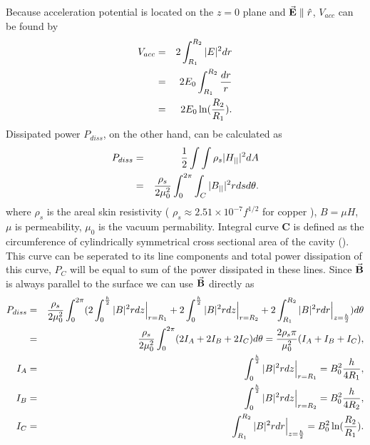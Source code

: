 \documentclass[a4paper,oneside,12pt]{report}
\numberwithin{equation}{chapter}
\begin{document}
Because acceleration potential is located on the $z=0$ plane and $\vec{\textbf{E}} \parallel \hat{r}$, $V_{acc}$ can be found by
\vspace{-10pt}\begin{eqnarray} 
    V_{acc} &=& 2 \int_{R_1}^{R_2} |E|^2 dr \nonumber\\
            &=& 2 E_0 \int_{R_1}^{R_2} \frac{dr}{r} \nonumber\\
            &=& 2 E_0 \ln(\frac{R_2}{R_1}). \label{eq:v_acc}
\vspace{-10pt}\end{eqnarray}
Dissipated power $P_{diss}$, on the other hand, can be calculated as \cite{rf}
\vspace{-10pt}\begin{eqnarray} 
    P_{diss} &=& \frac{1}{2} \int \int \rho_s | H_{||} |^2 dA \nonumber \\
             &=& \frac{\rho_s}{2\mu_0^2} \int_0^{2\pi} \int_C | B_{||} |^2 r ds d\theta . \label{eq:p_diss_C_curve}
\vspace{-10pt}\end{eqnarray}
where $\rho_s$ is the areal skin resistivity ( $\rho_s \approx 2.51 \times 10^{-7} f^{1/2}$ for copper \cite{rhodo_pottier} ), $B=\mu H$, $\mu$ is permeability, $\mu_0$ is the vacuum permability. 
Integral curve \textbf{C} is defined as the circumference of cylindrically symmetrical cross sectional area of the cavity ().
This curve can be seperated to its line components and total power dissipation of this curve, $P_C$ will be equal to sum of the power dissipated in these lines.
Since $\vec{\textbf{B}}$ is always parallel to the surface we can use $\vec{\textbf{B}}$ directly as
\vspace{-10pt}\begin{eqnarray}
    P_{diss} &=& \frac{\rho_s}{2\mu_0^2} \int_0^{2\pi} (
                   2\int_{0}^{\frac{h}{2}} |B|^2 r dz \Big|_{r=R_1}
                 + 2\int_{0}^{\frac{h}{2}} |B|^2 r dz \Big|_{r=R_2} 
                 + 2\int_{R_1}^{R_2} |B|^2 r dr \Big|_{z=\frac{h}{2}})d\theta \nonumber\\
             &=& \frac{\rho_s}{2\mu_0^2} \int_0^{2\pi} (2I_A + 2I_B + 2I_C)d\theta 
                 = \frac{2\rho_s \pi}{\mu_0^2}(I_A + I_B + I_C)   ,\\
    I_A &=& \int_{0}^{\frac{h}{2}} |B|^2 r dz \Big|_{r=R_1} = B_0^2 \frac{h}{4R_1}   ,\\
    I_B &=& \int_{0}^{\frac{h}{2}} |B|^2 r dz \Big|_{r=R_2} = B_0^2 \frac{h}{4R_2}   ,\\
    I_C &=& \int_{R_1}^{R_2} |B|^2 r dr \Big|_{z=\frac{h}{2}} = B_0^2 \ln(\frac{R_2}{R_1}) .
\vspace{-10pt}\end{eqnarray}
\end{document}
